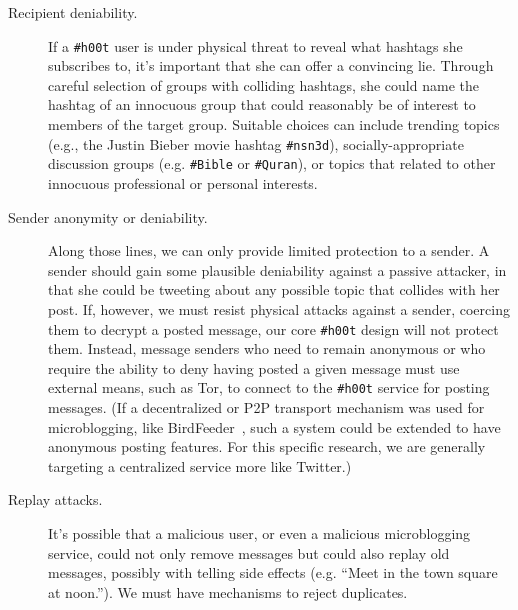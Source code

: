 \documentclass{sig-alternate-arxiv}
\newcommand{\hlfxnote}[1]{\fxnote{\hl{#1}}}
\newcommand{\hoot}{{\tt \#h00t}\xspace}
\begin{document}
\begin{description}
\item[Recipient deniability.] If a \hoot user is under physical threat to
  reveal what hashtags she subscribes to, it's important that she can
  offer a convincing lie. Through careful selection of groups with
  colliding hashtags, she could name the hashtag of an innocuous group
  that could reasonably be of interest to members of the target group.
  Suitable choices can include trending topics (e.g., the Justin Bieber
  movie hashtag {\tt \#nsn3d}), socially-appropriate discussion groups
  (e.g. {\tt \#Bible} or {\tt \#Quran}), or topics that related to
  other innocuous professional or personal interests.

\item[Sender anonymity or deniability.] Along those lines, we can only
  provide limited protection to a sender. A sender should gain some plausible
  deniability against a passive attacker, in that she could be
  tweeting about any possible topic that collides with her post.
 If, however, we must resist physical attacks against a sender,
coercing them to decrypt a posted message, our core \hoot design
will not protect them.
Instead, message senders who need to remain anonymous or who require the
ability to deny having posted a given message must use external means,
such as Tor, to connect to the \hoot service for posting messages. (If a
decentralized or P2P transport mechanism was used for microblogging,
like BirdFeeder~\cite{sandler09}, such a system could be extended to have
anonymous posting features. For this specific research, we are
generally targeting a centralized service more like Twitter.)

\item[Replay attacks.] It's possible that a malicious user, or even a
  malicious microblogging service, could not only remove messages but
  could also replay old messages, possibly with telling side effects
  (e.g. ``Meet in the town square at noon.''). We must have 
  mechanisms to reject duplicates.


\end{description}
\end{document}
